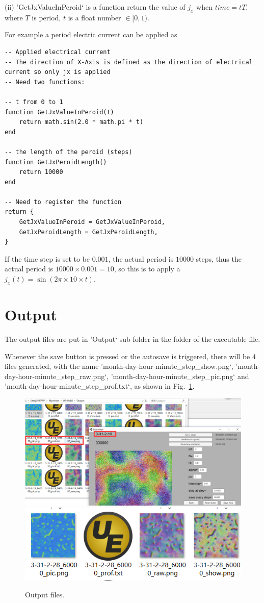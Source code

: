 \documentclass[aps,superscriptaddress,groupedaddress]{revtex4}  %
\begin{document}
(ii) 'GetJxValueInPeroid` is a function return the value of $j_x$ when $time=t T$, where $T$ is period, $t$ is a float number $\in [0,1)$.


For example a period electric current can be applied as
\begin{lstlisting}
-- Applied electrical current
-- The direction of X-Axis is defined as the direction of electrical current so only jx is applied
-- Need two functions:

-- t from 0 to 1
function GetJxValueInPeroid(t)
    return math.sin(2.0 * math.pi * t)
end

-- the length of the peroid (steps)
function GetJxPeroidLength()
    return 10000
end

-- Need to register the function
return {
    GetJxValueInPeroid = GetJxValueInPeroid,
    GetJxPeroidLength = GetJxPeroidLength,
}
\end{lstlisting}

If the time step is set to be $0.001$, the actual period is $10000$ steps, thus the actual period is $10000 \times 0.001 = 10$, so this is to apply a $j_x(t)=\sin (2\pi \times 10 \times t)$.



\section{\label{sec:6}Output}

The output files are put in 'Output` sub-folder in the folder of the executable file.

Whenever the save button is pressed or the autosave is triggered, there will be $4$ files generated, with the name 'month-day-hour-minute\_step\_show.png`, 'month-day-hour-minute\_step\_raw.png`, 'month-day-hour-minute\_step\_pic.png` and 'month-day-hour-minute\_step\_prof.txt`, as shown in Fig.~\ref{Fig:output}.
\begin{figure}
\includegraphics[scale=0.5]{intro4.png}
\includegraphics[scale=0.5]{output1.png}
\caption{\label{Fig:output}Output files.}
\end{figure}
\end{document}
